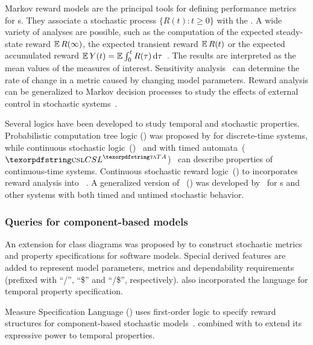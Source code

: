 Markov reward models are the principal tools for defining performance metrics
for s. They associate a stochastic process \(\{R(t) : t \ge 0\}\)
with the . A wide variety of analyses are possible, such as the
computation of the expected steady-state reward \(\operatorname{\mathbb{E}} R(\infty)\), the expected
transient reward \(\operatorname{\mathbb{E}} R(t)\) or the expected accumulated reward \(\operatorname{\mathbb{E}} Y(t) = \operatorname{\mathbb{E}} \int_{0}^t R(\tau)\, \mathrm{d}\tau\)~. The results are interpreted as the mean values of the measures of interest. Sensitivity analysis~ can determine the rate of change in a metric caused by changing model parameters. Reward analysis can be generalized to Markov decision processes to study the effects of external control in stochastic systems~\citep{Baier17maximizing}.

Several logics have been developed to study temporal and stochastic properties. Probabilistic computation tree logic () was proposed by \citet{Hansson94pctl} for discrete-time systems, while continuous stochastic logic~()~\citep{Aziz96csl} and  with timed automata~(\(\textabbr{CSL}^{\textabbr{TA}}\))~\citep{Donatelli09cslta} can describe properties of continuous-time systems. Continuous stochastic reward logic~() to incorporates reward analysis into ~\citep{Kwiatkowska06csrl}. A generalized version of ~() was developed by~\citet{Kuntz07gcsrl} for s and other systems with both timed and untimed stochastic behavior.

\subsubsection{Queries for component-based models}

An extension for  class diagrams was proposed by \citet{Bernardi03building} to construct stochastic metrics and property specifications for software models. Special derived features are added to represent model parameters, metrics and dependability requirements (prefixed with \enquote{/}, \enquote{\$} and \enquote{/\$}, respectively). \citet{Bernardi04trio} also incorporated the  language for temporal property specification.

Measure Specification Language () uses first-order logic to specify reward structures for component-based stochastic models~\citep{Aldini07msl}. \citet{Aldini11combining} combined  with  to extend its expressive power to temporal properties.

